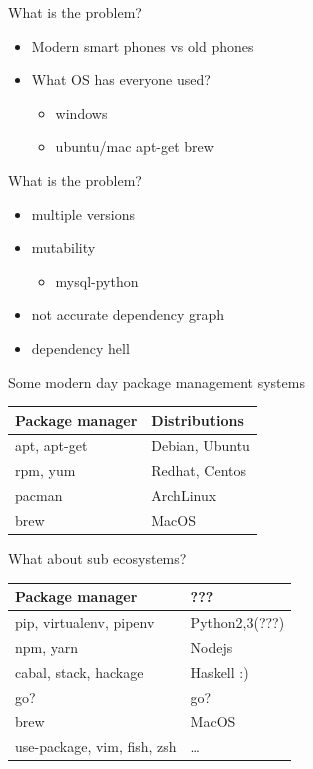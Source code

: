 \documentclass[presentation]{beamer}
\begin{document}
\begin{frame}[label={sec:org38cfab4},fragile]{What is the problem?}
 \begin{itemize}
\item Modern smart phones vs old phones
\item What OS has everyone used?
\begin{itemize}
\item windows
\item ubuntu/mac apt-get brew
\end{itemize}
\end{itemize}
\begin{block}{What is the problem?}
\begin{itemize}
\item multiple versions
\item mutability
\begin{itemize}
\item mysql-python
\end{itemize}
\item not accurate dependency graph
\item dependency hell
\end{itemize}
\end{block}
\begin{block}{Some modern day package management systems}
\begin{center}
\begin{tabular}{ll}
Package manager & Distributions\\
\hline
apt, apt-get & Debian, Ubuntu\\
rpm, yum & Redhat, Centos\\
pacman & ArchLinux\\
brew & MacOS\\
\end{tabular}
\end{center}
\end{block}
\begin{block}{What about sub ecosystems?}
\begin{center}
\begin{tabular}{ll}
Package manager & ???\\
\hline
pip, virtualenv, pipenv & Python2,3(???)\\
npm, yarn & Nodejs\\
cabal, stack, hackage & Haskell :)\\
go? & go?\\
brew & MacOS\\
use-package, vim, fish, zsh & \ldots{}\\

\end{tabular}
\end{center}
\end{block}
\end{frame}
\end{document}
